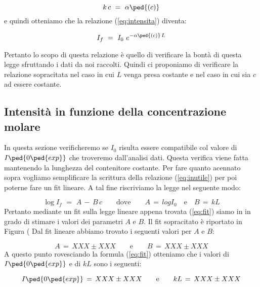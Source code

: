 \begin{equation}
	k\,c \,\,=\,\, \alpha\ped{(c)}
\end{equation}
%
e quindi otteniamo che la relazione (\ref{eq:intensita}) diventa:

\begin{equation}
	I_f \,\,=\,\, I_0 \,\, e^{-\alpha\ped{(c)}\,L}
	\label{eq:inutile}
\end{equation}
%

Pertanto lo scopo di questa relazione è quello di verificare la bontà di questa legge sfruttando i dati da noi raccolti.
Quindi ci proponiamo di verificare la relazione sopracitata nel caso in cui $L$ venga presa costante e nel caso in cui sia $c$ ad essere costante.

\subsection{Intensità in funzione della concentrazione molare}

In questa sezione verificheremo se $I_0$ risulta essere compatibile col valore di $I\ped{0\ped{exp}}$ che troveremo dall'analisi dati. Questa verifica viene fatta mantenendo la lunghezza del contenitore costante.
Per fare quanto acennato sopra vogliamo semplificare la scrittura della relazione (\ref{eq:inutile}) per poi poterne fare un fit lineare. A tal fine riscriviamo la legge nel seguente modo:

\begin{equation}
	\log{I_f} \,\,=\,\, A \,-\, B \, c \qquad \text{dove} \qquad A \,=\, log{I_0} \quad \text{e} \quad B\,=\, kL
	\label{eq:fit}
\end{equation}
%
Pertanto mediante un fit sulla legge lineare appena trovata (\ref{eq:fit}) siamo in in grado di stimare i valori dei parametri
$A$ e $B$. Il fit sopracitato è riportato in Figura (%
Dal fit lineare abbiamo trovato i seguenti valori per $A$ e $B$:

\begin{equation*}
	A \,=\, XXX \pm XXX \qquad \text{e} \qquad B \,=\, XXX \pm XXX
\end{equation*}
%
A questo punto rovesciando la formula (\ref{eq:fit}) otteniamo che i valori di $I\ped{0\ped{exp}}$ e di $kL$ sono i seguenti:

\begin{equation}
	I\ped{0\ped{exp}} \,=\, XXX \pm XXX \qquad \text{e} \qquad kL \,=\, XXX \pm XXX
\end{equation}
%



